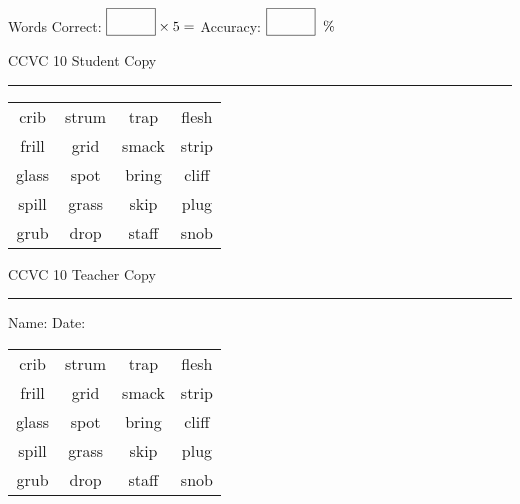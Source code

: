 \documentclass{memoir}
\begin{document}
\small

Words Correct: $\fbox{\phantom{\huge 100}} \times 5 = $ Accuracy: $\fbox{\phantom{\huge 100}}\;\; \%$ 

\vfill

\newpage


\footnotesize \noindent
CCVC 10 \hfill Student Copy
\smallskip
\hrule

\Large

\setlength{\tabcolsep}{14pt}
\def\arraystretch{3}

{\selectfont


\begin{vplace}[0.5]
\begin{center}
\begin{tabular}{cccc}
crib & strum & trap & flesh             \\
frill & grid & smack & strip \\
glass & spot & bring      & cliff            \\
spill & grass                    & skip & plug \\
grub & drop & staff            & snob \\
\end{tabular}
\end{center}
\end{vplace}

}

\newpage

\footnotesize \noindent
CCVC 10 \hfill Teacher Copy
\smallskip
\hrule

\small

\vfill

\noindent
Name: \underline{\hspace{1.75in}} \hfill Date: \underline{\hspace{1in}}

\Large

{\selectfont


\begin{vplace}[0.5]
\begin{center}
\begin{tabular}{cccc}
crib & strum & trap & flesh             \\
frill & grid & smack & strip \\
glass & spot & bring      & cliff            \\
spill & grass                    & skip & plug \\
grub & drop & staff            & snob \\
\end{tabular}
\end{center}
\end{vplace}



}
\end{document}
